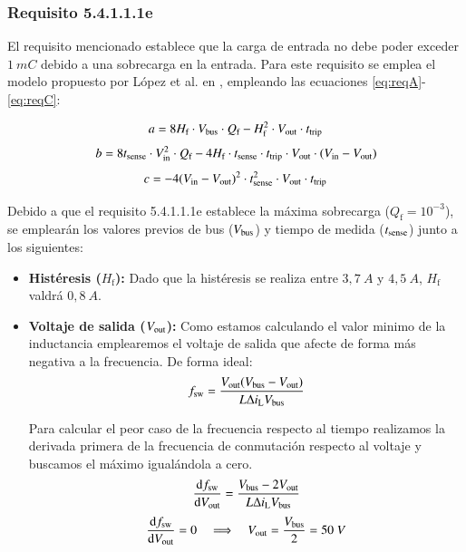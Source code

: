 \documentclass[12pt]{report} %
\begin{document}
\subsubsection{Requisito 5.4.1.1.1e}

El requisito mencionado establece que la carga de entrada no debe poder exceder $1~mC$ debido a una sobrecarga en la entrada. Para este requisito se emplea el modelo propuesto por López et al. en \cite{lopez_antuna_diseno_2024}, empleando las ecuaciones \ref{eq:reqA}-\ref{eq:reqC}:

\begin{equation}
    \label{eq:reqA}
    a=8H_\text{f}\cdot V_{\text{bus}} \cdot Q_\text{f} - H_\text{f}^2\cdot V_{\text{out}}\cdot t_\text{trip}
\end{equation}
\begin{equation}
    \label{eq:reqB}
    b=8t_\text{sense}\cdot V_{\text{in}}^2 \cdot Q_\text{f} - 4H_\text{f}\cdot t_\text{sense}\cdot t_\text{trip}\cdot V_{\text{out}} \cdot (V_{\text{in}}-V_{\text{out}})
\end{equation}
\begin{equation}
    \label{eq:reqC}
    c=-4(V_{\text{in}}-V_{\text{out}})^2 \cdot t_\text{sense}^2 \cdot V_{\text{out}} \cdot t_\text{trip}
\end{equation}

Debido a que el requisito 5.4.1.1.1e establece la máxima sobrecarga ($Q_\text{f}=10^{-3}$), se emplearán los valores previos de bus ($V_{\text{bus}}$) y tiempo de medida ($t_{\text{sense}}$) junto a los siguientes:

\begin{itemize}
\item \textbf{Histéresis ($H_\text{f}$):} Dado que la histéresis se realiza entre $3{,}7~A$ y $4{,}5~A$, $H_\text{f}$ valdrá $0{,}8~A$.
\item \textbf{Voltaje de salida ($V_{\text{out}}$):} Como estamos calculando el valor minimo de la inductancia emplearemos el voltaje de salida que afecte de forma más negativa a la frecuencia. De forma ideal:
\begin{equation}
    f_{\text{sw}} = \frac{V_{\text{out}} (V_{\text{bus}} - V_{\text{out}})}{L \Delta i_\text{L} V_{\text{bus}}}
    \label{eq:fswitch}
\end{equation}

Para calcular el peor caso de la frecuencia respecto al tiempo realizamos la derivada primera de la frecuencia de conmutación respecto al voltaje y buscamos el máximo igualándola a cero. 
\begin{equation}
    \dv{f_{\text{sw}}}{V_{\text{out}}} = \frac{V_{\text{bus}} - 2V_{\text{out}}}{L \Delta i_\text{L} V_{\text{bus}}}
    \label{eq:derivada_fsw}
\end{equation}
\begin{equation}
   \dv{f_{\text{sw}}}{V_{\text{out}}} = 0 \quad \Longrightarrow \quad V_{\text{out}} = \frac{V_{\text{bus}}}{2} = 50~V
    \label{eq:derivada_vout}
\end{equation}
\end{itemize}
\end{document}
